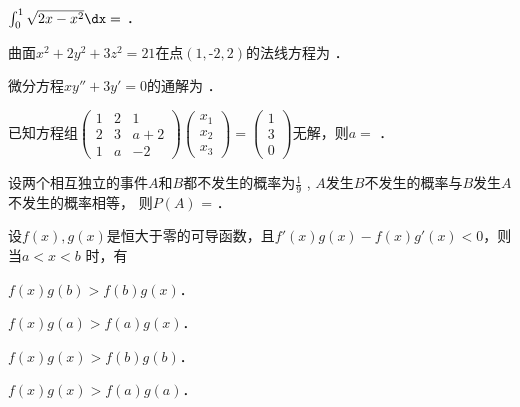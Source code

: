 \documentclass[plain,noanswer,medmath]{../../template/jnuexam}
\begin{document}




\begin{problem}
$\int_0^1 \sqrt{2x - x^2} \dx =$ \fillin{}．
\end{problem}


\begin{problem}
曲面$x^2 + 2y^2 + 3z^2 = 21$在点$\left(1,\text{-}2,2 \right)$的法线方程为 \fillin{}．
\end{problem}


\begin{problem}
微分方程$xy'' + 3y' = 0$的通解为 \fillin{}．
\end{problem}


\begin{problem}
已知方程组$\begin{pmatrix}
  1 & 2 & 1 \\
  2 & 3 & a + 2 \\
  1 & a & -2
\end{pmatrix}\begin{pmatrix}
  x_1 \\
  x_2 \\
  x_3
\end{pmatrix} = \begin{pmatrix}
  1 \\
  3 \\
  0
\end{pmatrix}$无解，则$a =$ \fillin{}．
\end{problem}


\begin{problem}
设两个相互独立的事件$A$和$B$都不发生的概率为$\frac{1}{9}$ , $A$发生$B$不发生的概率与$B$发生$A$不发生的概率相等，
则$P(A)$ = \fillin{}．
\end{problem}




\begin{problem}
设$f(x),g(x)$是恒大于零的可导函数，且$f'(x)g(x) - f(x)g'(x) < 0$，则当$a < x < b$ 时，有\pickout{}
\begin{abcd}
\item $f(x)g(b) > f(b)g(x)$．
\item $f(x)g(a) > f(a)g(x)$．
\item $f(x)g(x) > f(b)g(b)$．
\item $f(x)g(x) > f(a)g(a)$．
\end{abcd}
\end{problem}
\end{document}
